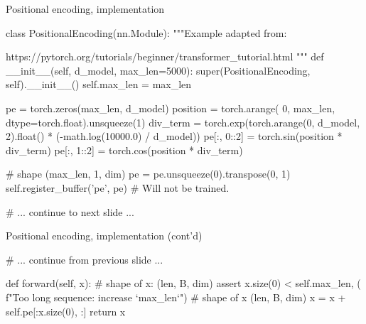 \begin{frame}[fragile]{Positional encoding, implementation}
\vspace{-5mm}
\begin{python}
class PositionalEncoding(nn.Module):
    """Example adapted from:

    https://pytorch.org/tutorials/beginner/transformer_tutorial.html
    """
    def __init__(self, d_model, max_len=5000):
        super(PositionalEncoding, self).__init__()
        self.max_len = max_len

        pe = torch.zeros(max_len, d_model)
        position = torch.arange(
            0, max_len, dtype=torch.float).unsqueeze(1)
        div_term = torch.exp(torch.arange(0, d_model, 2).float()
                             * (-math.log(10000.0) / d_model))
        pe[:, 0::2] = torch.sin(position * div_term)
        pe[:, 1::2] = torch.cos(position * div_term)

        # shape (max_len, 1, dim)
        pe = pe.unsqueeze(0).transpose(0, 1)
        self.register_buffer('pe', pe)  # Will not be trained.

# ... continue to next slide ...
\end{python}
\end{frame}


\begin{frame}[fragile]{Positional encoding, implementation (cont'd)}
\vspace{-5mm}
\begin{python}
# ... continue from previous slide ...

    def forward(self, x):
        # shape of x: (len, B, dim)
        assert x.size(0) < self.max_len, (
            f"Too long sequence: increase `max_len`")
        # shape of x (len, B, dim)
        x = x + self.pe[:x.size(0), :]
        return x

\end{python}
\end{frame}

